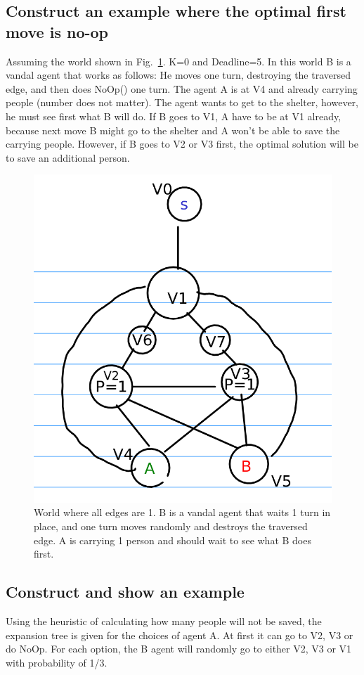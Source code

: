\documentclass{article}                     %
\begin{document}
	\subsection{Construct an example where the optimal first move is no-op}
	Assuming the world shown in Fig.~\ref{fig:q41}. K=0 and Deadline=5. In this world B is a vandal agent that works as follows: He moves one turn, destroying the traversed edge, and then does NoOp() one turn.
	The agent A is at V4 and already carrying people (number does not matter). The agent wants to get to the shelter, however, he must see first what B will do. If B goes to V1, A have to be at V1 already, because next move B might go to the shelter and A won't be able to save the carrying people. However, if B goes to V2 or V3 first, the optimal solution will be to save an additional person.
	\begin{figure}[H]
		\centering
		\includegraphics[width=0.7\linewidth]{q4_1.png}
		\caption{World where all edges are 1. B is a vandal agent that waits 1 turn in place, and one turn moves randomly and destroys the traversed edge. A is carrying 1 person and should wait to see what B does first.}
		\label{fig:q41}
	\end{figure}

	\subsection{Construct and show an example}
	Using the heuristic of calculating how many people will not be saved, the expansion tree is given for the choices of agent A. At first it can go to V2, V3 or do NoOp. For each option, the B agent will randomly go to either V2, V3 or V1 with probability of 1/3. 
	
\end{document}

